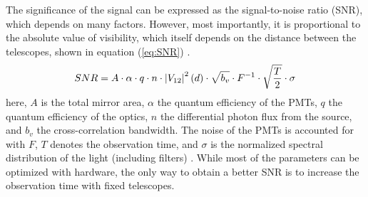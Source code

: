 The significance of the signal can be expressed as the signal-to-noise ratio (SNR), which depends on many factors. However, most importantly, it is proportional to the absolute value of visibility, which itself depends on the distance between the telescopes, shown in equation (\ref{eq:SNR}) \cite{acciari2020optical}.  
\begin{equation}
	SNR = A \cdot \alpha \cdot q \cdot n \cdot \left|V_{12}\right|^{2}(d) \cdot \sqrt{b_v} \cdot F^{-1} \cdot \sqrt{\frac{T}{2}} \cdot \sigma
	\label{eq:SNR}
\end{equation}
here, $A$ is the total mirror area, $\alpha$ the quantum efficiency of the PMTs, $q$ the quantum efficiency of the optics, $n$ the differential photon flux from the source, and $b_v$ the cross-correlation bandwidth. The noise of the PMTs is accounted for with $F$, $T$ denotes the observation time, and $\sigma$ is the normalized spectral distribution of the light (including filters) \cite{acciari2020optical}. While most of the parameters can be optimized with hardware, the only way to obtain a better SNR is to increase the observation time with fixed telescopes.  

